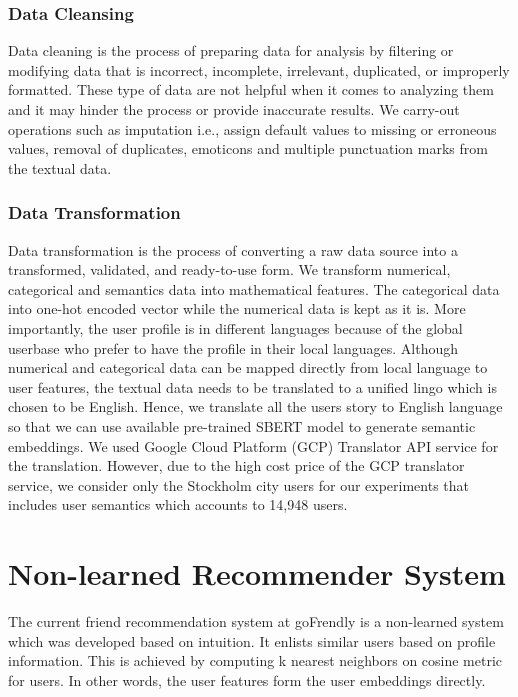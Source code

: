 \documentclass{kththesis}
\begin{document}
\subsubsection{Data Cleansing}
\noindent Data cleaning is the process of preparing data for analysis by filtering or modifying data that is incorrect, incomplete, irrelevant, duplicated, or improperly formatted. These type of data are not helpful when it comes to analyzing them and it may hinder the process or provide inaccurate results. We carry-out operations such as imputation i.e., assign default values to missing or erroneous values, removal of duplicates, emoticons and multiple punctuation marks from the textual data.

\subsubsection{Data Transformation}
\noindent Data transformation is the process of converting a raw data source into a transformed, validated, and ready-to-use form. We transform numerical, categorical and semantics data into mathematical features. The categorical data into one-hot encoded vector while the numerical data is kept as it is. More importantly, the user profile is in different languages because of the global userbase who prefer to have the profile in their local languages. Although numerical and categorical data can be mapped directly from local language to user features, the textual data needs to be translated to a unified lingo which is chosen to be English. Hence, we translate all the users story to English language so that we can use available pre-trained SBERT model to generate semantic embeddings. We used Google Cloud Platform (GCP) Translator API service for the translation. However, due to the high cost price of the GCP translator service, we consider only the Stockholm city users for our experiments that includes user semantics which accounts to 14,948 users. 

\section{Non-learned Recommender System}
The current friend recommendation system at goFrendly is a non-learned system which was developed based on intuition. It enlists similar users based on profile information. This is achieved by computing k nearest neighbors on cosine metric for users. In other words, the user features form the user embeddings directly. \\
\end{document}
